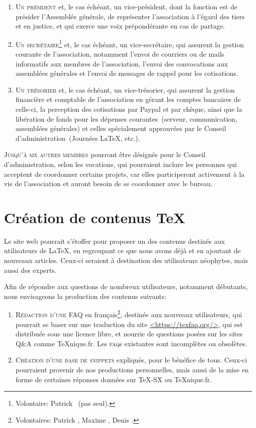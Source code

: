 \documentclass{tufte-handout}
\newcommand{\ratio}[3][]{\marginpar{\footnotesize{\textcolor{teal}{Temps requis: #2 / Utilité: #3}\par\noindent \textcolor{teal}{#1}}}}
\begin{document}
\begin{enumerate}
	\item\textsc{Un président} et, le cas échéant, un vice-président, dont la fonction est de présider l'Assemblée générale, de représenter l'association à l'égard des tiers et en justice, et qui exerce une voix prépondérante en cas de partage.
	\item\textsc{Un secrétaire}\footnote{Volontaire: Patrick ~(pas seul).} et, le cas échéant, un vice-secrétaire, qui assurent la gestion courante de l'association, notamment l'envoi de courriers ou de mails informatifs aux membres de l'association, l'envoi des convocations aux assemblées générales et l'envoi de messages de rappel pour les cotisations.
	\item\textsc{Un trésorier} et, le cas échéant, un vice-trésorier, qui assurent la gestion financière et comptable de l'association en gérant les comptes bancaires de celle-ci, la perception des cotisations par Paypal et par chèque, ainsi que la libération de fonds pour les dépenses courantes~(serveur, communication, assemblées générales) et celles spécialement approuvées par le Conseil d'administration~(Journées \LaTeX, etc.).
\end{enumerate}

\textsc{Jusqu'à six autres membres} pourront être désignés pour le Conseil d'administration, selon les vocations, qui pourraient inclure les personnes qui acceptent de coordonner certains projets, car elles participeront activement à la vie de l'association et auront besoin de se coordonner avec le bureau.

\section{Création de contenus \TeX}

Le site web pourrait s'étoffer pour proposer un des contenus destinés aux utilisateurs de \LaTeX, en regroupant ce que nous avons déjà et en ajoutant de nouveaux articles. Ceux-ci seraient à destination des utilisateurs néophytes, mais aussi des experts.

Afin de répondre aux questions de nombreux utilisateurs, notamment débutants, nous envisageons la production des contenus suivants:

\begin{enumerate}
	\item\textsc{Rédaction d'une FAQ}\ratio[Effort collectif possible]{+++}{+++} en français\footnote{Volontaires: Patrick , Maxime , Denis .}, destinée aux nouveaux utilisateurs, qui pourrait se baser sur une traduction du site \url{<https://texfaq.org/>}, qui est distribuée sous une licence libre, et nourrie de questions posées sur les sites Q\&A comme \TeX nique.fr. Les \textsc{faq}s existantes sont incomplètes ou obsolètes.
	\item\textsc{Création d'une base de snippets}\ratio[Petites contributions régulières, sur le long terme]{++}{+++}  expliqués, pour le bénéfice de tous. Ceux-ci pourraient provenir de nos productions personnelles, mais aussi de la mise en forme de certaines réponses données sur TeX-SX ou \TeX nique.fr.
\end{enumerate}
\end{document}
